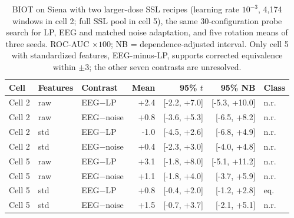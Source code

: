 \begin{table}[!htbp]
\caption{BIOT on Siena with two larger-dose SSL recipes (learning rate $10^{-3}$, 4,174 windows in cell 2; full SSL pool in cell 5), the same 30-configuration probe search for LP, EEG and matched noise adaptation, and five rotation means of three seeds. ROC-AUC $\times100$; NB = dependence-adjusted interval. Only cell 5 with standardized features, EEG-minus-LP, supports corrected equivalence within $\pm3$; the other seven contrasts are unresolved.}
\label{tab:d32-roc_auc}
\centering\footnotesize
\setlength{\tabcolsep}{3pt}
\begin{tabular}{lllrrrl}
\toprule
Cell & Features & Contrast & Mean & 95\% $t$ & 95\% NB & Class\\
\midrule
Cell 2 & raw & EEG$-$LP & +2.4 & [-2.2, +7.0] & [-5.3, +10.0] & n.r.\\
Cell 2 & raw & EEG$-$noise & +0.8 & [-3.6, +5.3] & [-6.5, +8.2] & n.r.\\
Cell 2 & std & EEG$-$LP & -1.0 & [-4.5, +2.6] & [-6.8, +4.9] & n.r.\\
Cell 2 & std & EEG$-$noise & +0.4 & [-2.3, +3.0] & [-4.0, +4.8] & n.r.\\
Cell 5 & raw & EEG$-$LP & +3.1 & [-1.8, +8.0] & [-5.1, +11.2] & n.r.\\
Cell 5 & raw & EEG$-$noise & +1.1 & [-1.8, +4.0] & [-3.7, +5.9] & n.r.\\
Cell 5 & std & EEG$-$LP & +0.8 & [-0.4, +2.0] & [-1.2, +2.8] & eq.\\
Cell 5 & std & EEG$-$noise & +1.5 & [-0.7, +3.7] & [-2.1, +5.1] & n.r.\\
\bottomrule
\end{tabular}
\end{table}
